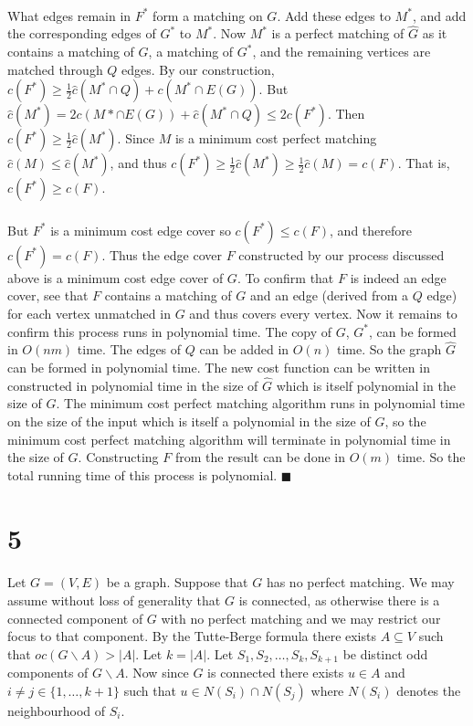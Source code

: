 \documentclass[letterpaper,12pt,oneside,onecolumn]{report}
\begin{document}
\paragraph{}
What edges remain in $F^*$ form a matching on $G$. Add these edges to $M^*$, and add the corresponding edges of $G^*$ to $M^*$. Now $M^*$ is a perfect matching of $\hat{G}$ as it contains a matching of $G$, a matching of $G^*$, and the remaining vertices are matched through $Q$ edges. By our construction, $c(F^*) \geq \frac{1}{2}\hat{c}(M^* \cap Q) + c(M^* \cap E(G))$. But $\hat{c}(M^*) = 2c(M* \cap E(G)) + \hat{c}(M^* \cap Q) \leq 2c(F^*)$. Then $c(F^*) \geq \frac{1}{2} \hat{c}(M^*)$. Since $M$ is a minimum cost perfect matching $\hat{c}(M) \leq \hat{c}(M^*)$, and thus $c(F^*) \geq \frac{1}{2} \hat{c}(M^*) \geq \frac{1}{2}\hat{c}(M) = c(F)$. That is, $c(F^*) \geq c(F)$.
\paragraph{}
But $F^*$ is a minimum cost edge cover so $c(F^*) \leq c(F)$, and therefore $c(F^*) = c(F)$. Thus the edge cover $F$ constructed by our process discussed above is a minimum cost edge cover of $G$. To confirm that $F$ is indeed an edge cover, see that $F$ contains a matching of $G$ and an edge (derived from a $Q$ edge) for each vertex unmatched in $G$ and thus covers every vertex. Now it remains to confirm this process runs in polynomial time. The copy of $G$, $G^*$, can be formed in $O(nm)$ time. The edges of $Q$ can be added in $O(n)$ time. So the graph $\hat{G}$ can be formed in polynomial time. The new cost function can be written in constructed in polynomial time in the size of $\hat{G}$ which is itself polynomial in the size of $G$. The minimum cost perfect matching algorithm runs in polynomial time on the size of the input which is itself a polynomial in the size of $G$, so the minimum cost perfect matching algorithm will terminate in polynomial time in the size of $G$. Constructing $F$ from the result can be done in $O(m)$ time. So the total running time of this process is polynomial. $\blacksquare$

\section*{5}
\paragraph{}
Let $G=(V,E)$ be a graph. Suppose that $G$ has no perfect matching. We may assume without loss of generality that $G$ is connected, as otherwise there is a connected component of $G$ with no perfect matching and we may restrict our focus to that component. By the Tutte-Berge formula there exists $A \subseteq V$ such that $oc(G\backslash A) > |A|$. Let $k = |A|$. Let $S_1, S_2, \dots, S_k, S_{k+1}$ be distinct odd components of $G\backslash A$. Now since $G$ is connected there exists $u \in A$ and $i \neq j \in \{1,\dots, k+1\}$ such that $u \in N(S_i) \cap N(S_j)$ where $N(S_i)$ denotes the neighbourhood of $S_i$.
\end{document}
